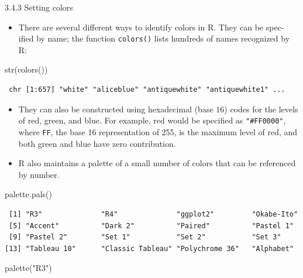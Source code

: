 \documentclass[
  9pt,
  a4paper,
  ignorenonframetext,
  notheorems]{beamer}
\newenvironment{Shaded}{\begin{snugshade}}{\end{snugshade}}
\newcommand{\FunctionTok}[1]{\textcolor[rgb]{0.28,0.35,0.67}{#1}}
\newcommand{\NormalTok}[1]{\textcolor[rgb]{0.00,0.23,0.31}{#1}}
\newcommand{\StringTok}[1]{\textcolor[rgb]{0.13,0.47,0.30}{#1}}
\providecommand{\tightlist}{%
  \setlength{\itemsep}{0pt}\setlength{\parskip}{0pt}}\usepackage{longtable,booktabs,array}
\begin{document}
\begin{frame}[fragile]
\begin{block}{3.4.3 Setting colors}
\protect\hypertarget{setting-colors}{}
\begin{itemize}
\tightlist
\item
  There are several different ways to identify colors in R. They can be
  spec- ified by name; the function \texttt{colors()} lists hundreds of
  names recognized by R:
\end{itemize}

\begin{Shaded}
\begin{Highlighting}[]
\FunctionTok{str}\NormalTok{(}\FunctionTok{colors}\NormalTok{())}
\end{Highlighting}
\end{Shaded}

\begin{verbatim}
 chr [1:657] "white" "aliceblue" "antiquewhite" "antiquewhite1" ...
\end{verbatim}

\begin{itemize}
\item
  They can also be constructed using hexadecimal (base 16) codes for the
  levels of red, green, and blue. For example, red would be specified as
  \texttt{"\#FF0000"}, where \texttt{FF}, the base 16 representation of
  255, is the maximum level of red, and both green and blue have zero
  contribution.
\item
  R also maintains a palette of a small number of colors that can be
  referenced by number.
\end{itemize}

\begin{Shaded}
\begin{Highlighting}[]
\FunctionTok{palette.pals}\NormalTok{()}
\end{Highlighting}
\end{Shaded}

\begin{verbatim}
 [1] "R3"              "R4"              "ggplot2"         "Okabe-Ito"      
 [5] "Accent"          "Dark 2"          "Paired"          "Pastel 1"       
 [9] "Pastel 2"        "Set 1"           "Set 2"           "Set 3"          
[13] "Tableau 10"      "Classic Tableau" "Polychrome 36"   "Alphabet"       
\end{verbatim}

\begin{Shaded}
\begin{Highlighting}[]
\FunctionTok{palette}\NormalTok{(}\StringTok{"R3"}\NormalTok{)}
\end{Highlighting}
\end{Shaded}


\end{block}
\end{frame}
\end{document}
